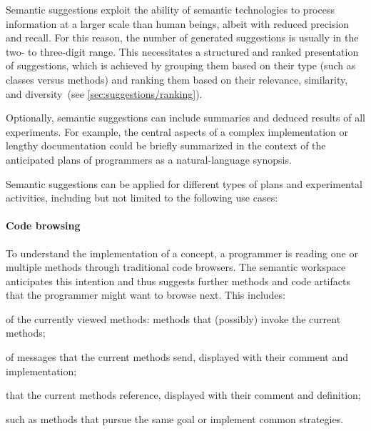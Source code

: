 Semantic suggestions exploit the ability of semantic technologies to process information at a larger scale than human beings, albeit with reduced precision and recall.
For this reason, the number of generated suggestions is usually in the two- to three-digit range.
This necessitates a structured and ranked presentation of suggestions, which is achieved by grouping them based on their type (such as classes versus methods) and ranking them based on their relevance, similarity, and diversity~(see \cref{sec:suggestions/ranking}).

Optionally, semantic suggestions can include summaries and deduced results of all experiments.
For example, the central aspects of a complex implementation or lengthy documentation could be briefly summarized in the context of the anticipated plans of programmers as a natural-language synopsis.

Semantic suggestions can be applied for different types of plans and experimental activities, including but not limited to the following use cases:

	\paragraph{Code browsing}
	To understand the implementation of a concept, a programmer is reading one or multiple methods through traditional code browsers.
	The semantic workspace anticipates this intention and thus suggests further methods and code artifacts that the programmer might want to browse next.
	This includes:

	\begin{description}[noextralabelsep]
		\item[senders] of the currently viewed methods: methods that (possibly) invoke the current methods;
		\item[implementors] of messages that the current methods send, displayed with their comment and implementation;
		\item[classes] that the current methods reference, displayed with their comment and definition;
		\item[similar methods,] such as methods that pursue the same goal or implement common strategies.
	\end{description}

